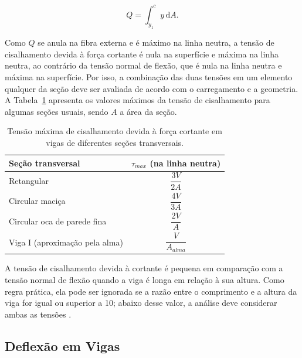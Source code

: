\documentclass[arial,centeredequations,english,brazilian,oneside,section=TITLE]{ifes8}
\begin{document}
\begin{equation}
  \label{eq:Q}
  Q = \int_{y_1}^{c} y\,\mathrm{d}A.
\end{equation}

Como $Q$ se anula na fibra externa e é máximo na linha neutra, a tensão de
cisalhamento devida à força cortante é nula na superfície e máxima na linha neutra,
ao contrário da tensão normal de flexão, que é nula na linha neutra e máxima na
superfície. Por isso, a combinação das duas tensões em um elemento qualquer da seção
deve ser avaliada de acordo com o carregamento e a geometria.
A Tabela~\ref{tab:tau-max} apresenta os valores máximos
da tensão de cisalhamento para algumas seções usuais, sendo $A$ a área da seção.

\begin{table}[h]
  \caption{Tensão máxima de cisalhamento devida à força cortante em vigas de
    diferentes seções transversais.}
  \label{tab:tau-max}
  \begin{center}
    \begin{tabular}{lc}
      \toprule
      Seção transversal                   & $\tau_{max}$ (na linha neutra)  \\
      \midrule
      Retangular                          & $\dfrac{3V}{2A}$                \\[2ex]
      Circular maciça                     & $\dfrac{4V}{3A}$                \\[2ex]
      Circular oca de parede fina         & $\dfrac{2V}{A}$                 \\[2ex]
      Viga I (aproximação pela alma)      & $\dfrac{V}{A_{alma}}$           \\
      \bottomrule
    \end{tabular}
  \end{center}
\end{table}

A tensão de cisalhamento devida à cortante é pequena em comparação com a tensão
normal de flexão quando a viga é longa em relação à sua altura. Como regra prática,
ela pode ser ignorada se a razão entre o comprimento e a altura da viga for igual
ou superior a 10; abaixo desse valor, a análise deve considerar ambas as tensões
\cite{Norton2013}.

\subsection{Deflexão em Vigas}
\label{sub:deflexao-vigas}
\end{document}
